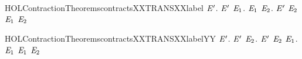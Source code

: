 \begin{SaveVerbatim}{HOLContractionTheoremscontractsXXTRANSXXlabel}
\HOLTokenTurnstile{} \HOLSymConst{\HOLTokenForall{}} \ensuremath{\HOLBoundVar{E}\sp{\prime}}.
         \ensuremath{\HOLBoundVar{E}\sp{\prime}} \HOLSymConst{\HOLTokenImp{}}
       \HOLSymConst{\HOLTokenForall{}} \ensuremath{\HOLBoundVar{E}\sb{\mathrm{1}}}.
            \HOLTokenTransBegin{} \HOLTokenTransEnd \ensuremath{\HOLBoundVar{E}\sb{\mathrm{1}}} \HOLSymConst{\HOLTokenImp{}}
           \HOLSymConst{\HOLTokenExists{}}\ensuremath{\HOLBoundVar{E}\sb{\mathrm{2}}}. \ensuremath{\HOLBoundVar{E}\sp{\prime}} \HOLTokenTransBegin{} \HOLTokenTransEnd \ensuremath{\HOLBoundVar{E}\sb{\mathrm{2}}} \HOLSymConst{\HOLTokenConj{}} \ensuremath{\HOLBoundVar{E}\sb{\mathrm{1}}}  \ensuremath{\HOLBoundVar{E}\sb{\mathrm{2}}}
\end{SaveVerbatim}
\newcommand{\HOLContractionTheoremscontractsXXTRANSXXlabel}{\UseVerbatim{HOLContractionTheoremscontractsXXTRANSXXlabel}}
\begin{SaveVerbatim}{HOLContractionTheoremscontractsXXTRANSXXlabelYY}
\HOLTokenTurnstile{} \HOLSymConst{\HOLTokenForall{}} \ensuremath{\HOLBoundVar{E}\sp{\prime}}.
         \ensuremath{\HOLBoundVar{E}\sp{\prime}} \HOLSymConst{\HOLTokenImp{}}
       \HOLSymConst{\HOLTokenForall{}} \ensuremath{\HOLBoundVar{E}\sb{\mathrm{2}}}.
           \ensuremath{\HOLBoundVar{E}\sp{\prime}} \HOLTokenTransBegin{} \HOLTokenTransEnd \ensuremath{\HOLBoundVar{E}\sb{\mathrm{2}}} \HOLSymConst{\HOLTokenImp{}}
           \HOLSymConst{\HOLTokenExists{}}\ensuremath{\HOLBoundVar{E}\sb{\mathrm{1}}}.  \HOLTokenWeakTransBegin{} \HOLTokenWeakTransEnd \ensuremath{\HOLBoundVar{E}\sb{\mathrm{1}}} \HOLSymConst{\HOLTokenConj{}}  \ensuremath{\HOLBoundVar{E}\sb{\mathrm{1}}} \ensuremath{\HOLBoundVar{E}\sb{\mathrm{2}}}
\end{SaveVerbatim}
\newcommand{\HOLContractionTheoremscontractsXXTRANSXXlabelYY}{\UseVerbatim{HOLContractionTheoremscontractsXXTRANSXXlabelYY}}
